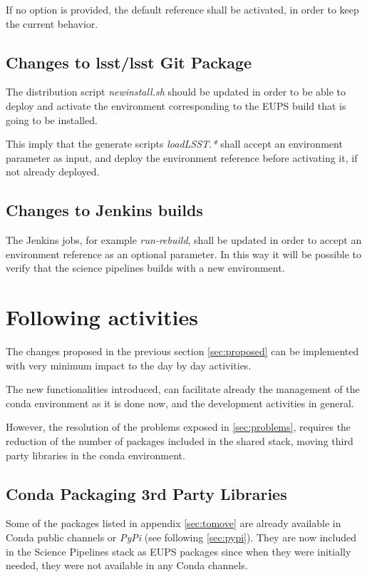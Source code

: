 If no option is provided, the default reference shall be activated, in order to keep the current behavior.


\subsection{Changes to lsst/lsst Git Package} \label{sec:newinstall}

The distribution script \textit{newinstall.sh} should be updated in order to be able to deploy and activate the environment corresponding to the EUPS build that is going to be installed.

This imply that the generate scripts \textit{loadLSST.*} shall accept an environment parameter as input, and deploy the environment reference before activating it, if not already deployed.


\subsection{Changes to Jenkins builds} \label{sec:cibuilds}

The Jenkins jobs, for example \textit{run-rebuild}, shall be updated in order to accept an environment reference as an optional parameter.
In this way it will be possible to verify that the science pipelines builds with a new environment.


\newpage
\section{Following activities}

The changes proposed in the previous section \ref{sec:proposed} can be implemented with very minimum impact to the day by day activities.

The new functionalities introduced, can facilitate already the management of the conda environment as it is done now, and the development activities in general.

However, the resolution of the problems exposed in \ref{sec:problems}, requires the reduction of the number of packages included in the shared stack, moving third party libraries in the conda environment.


\subsection{Conda Packaging 3rd Party Libraries} \label{sec:3rdpkgs}

Some of the packages listed in appendix \ref{sec:tomove} are already available in Conda public channels or \textit{PyPi} (see following \ref{sec:pypi}).
They are now included in the Science Pipelines stack as EUPS packages since when they were initially needed, they were not available in any Conda channels.

